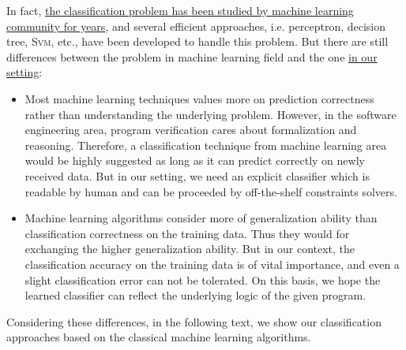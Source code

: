 In fact, \underline{the classification problem has been studied by machine learning community for years},
and several efficient approaches, i.e. perceptron, decision tree, \textsc{Svm}, etc., have been developed to handle this problem.
But there are still differences between the problem in machine learning field and the one \underline{in our setting}:
\begin{itemize}
\item Most machine learning techniques values more on prediction correctness rather than understanding the underlying problem. 
However, in the software engineering area, program verification cares about formalization and reasoning.
Therefore, a classification technique from machine learning area would be highly suggested as long as it can predict correctly on newly received data.
But in our setting, we need an explicit classifier which is readable by human and can be proceeded by off-the-shelf constraints solvers.
\item Machine learning algorithms consider more of generalization ability than classification correctness on the training data.
Thus they would  for exchanging the higher generalization ability.  
But in our context, the classification accuracy on the training data is of vital importance,
and even a slight classification error can not be tolerated.
On this basis, we hope the learned classifier can reflect the underlying logic of the given program.
\end{itemize} 
Considering these differences,
in the following text, 
we show our classification approaches based on the classical machine learning algorithms. 


